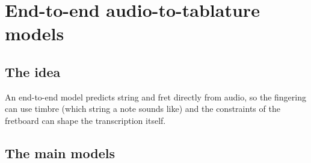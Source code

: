 \section{End-to-end audio-to-tablature models}
\label{sec:e2e}

\subsection{The idea}

An end-to-end model predicts string and fret directly from audio, so the
fingering can use timbre (which string a note sounds like) and the constraints
of the fretboard can shape the transcription itself.

\subsection{The main models}

